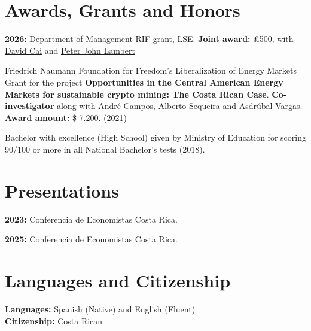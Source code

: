 \documentclass[]{resume-openfont}
\begin{document}
\section{Awards, Grants and Honors}
\begin{bullets}
    \item \textbf{2026:} Department of Management RIF grant, LSE. \textbf{Joint award:} £500, with \href{https://davidjiyangcai.wordpress.com/}{David Cai} and \href{https://peterjohnlambert.com/}{Peter John Lambert}
    \item Friedrich Naumann Foundation for Freedom's Liberalization of Energy Markets Grant for the project \textbf{Opportunities in the Central American Energy Markets for sustainable crypto mining: The Costa Rican Case}. \textbf{Co-investigator} along with André Campos, Alberto Sequeira and Asdrúbal Vargas. \textbf{Award amount:} \$ 7.200. (2021)
    \item Bachelor with excellence (High School) given by Ministry of Education for scoring 90/100 or more in all National Bachelor's tests (2018). 
\end{bullets}
\sectionsep

\section{Presentations}
\begin{bullets}
    \item \textbf{2023:} Conferencia de Economistas Costa Rica.
    \item \textbf{2025:} Conferencia de Economistas Costa Rica.
\end{bullets}




\sectionsep



\section{Languages and Citizenship}
\textbf{Languages:} Spanish (Native) and English (Fluent)\\
\textbf{Citizenship:} Costa Rican
\end{document}
